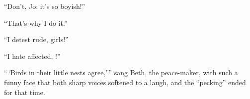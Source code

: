 \documentclass{fiche}
\begin{document}
\begin{texte}
``Don't, Jo; it's so boyish!''

``That's why I do it.''

``I detest rude,  girls!''

``I hate affected, !''

``\,`Birds in their little nests agree,'\,'' sang Beth, the peace-maker, with such a funny
face that both sharp voices softened to a laugh, and the ``pecking'' ended for that time.
\end{texte}

\end{document}
